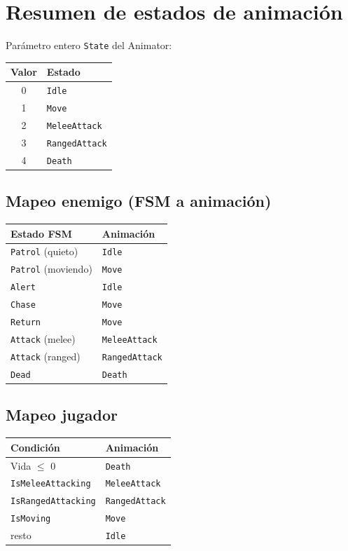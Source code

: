 \documentclass[a4paper,12pt]{article}
\begin{document}
\section{Resumen de estados de animación}

Parámetro entero \texttt{State} del Animator:

\begin{center}
\begin{tabular}{|c|l|}
\hline
\textbf{Valor} & \textbf{Estado} \\
\hline
0 & \texttt{Idle} \\
1 & \texttt{Move} \\
2 & \texttt{MeleeAttack} \\
3 & \texttt{RangedAttack} \\
4 & \texttt{Death} \\
\hline
\end{tabular}
\end{center}

\subsection{Mapeo enemigo (FSM a animación)}

\begin{center}
\begin{tabular}{|l|l|}
\hline
\textbf{Estado FSM} & \textbf{Animación} \\
\hline
\texttt{Patrol} (quieto) & \texttt{Idle} \\
\texttt{Patrol} (moviendo) & \texttt{Move} \\
\texttt{Alert} & \texttt{Idle} \\
\texttt{Chase} & \texttt{Move} \\
\texttt{Return} & \texttt{Move} \\
\texttt{Attack} (melee) & \texttt{MeleeAttack} \\
\texttt{Attack} (ranged) & \texttt{RangedAttack} \\
\texttt{Dead} & \texttt{Death} \\
\hline
\end{tabular}
\end{center}

\subsection{Mapeo jugador}

\begin{center}
\begin{tabular}{|l|l|}
\hline
\textbf{Condición} & \textbf{Animación} \\
\hline
Vida $\leq$ 0 & \texttt{Death} \\
\texttt{IsMeleeAttacking} & \texttt{MeleeAttack} \\
\texttt{IsRangedAttacking} & \texttt{RangedAttack} \\
\texttt{IsMoving} & \texttt{Move} \\
resto & \texttt{Idle} \\
\hline
\end{tabular}
\end{center}
\end{document}
